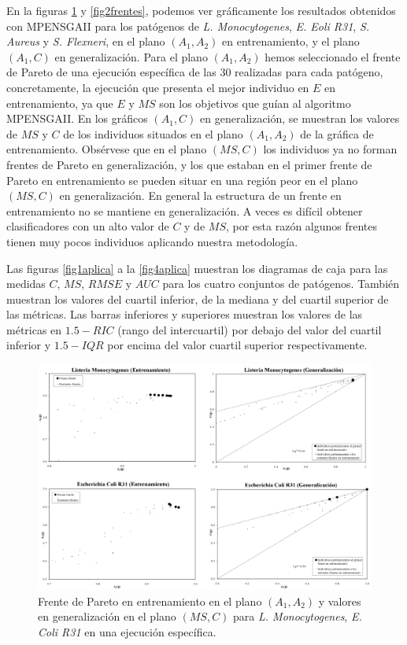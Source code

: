 En la figuras \ref{fig1frentes} y \ref{fig2frentes}, podemos ver gráficamente los resultados
obtenidos con
MPENSGAII para los patógenos de \textit{L. Monocytogenes}, \textit{E. Eoli R31}, \textit{S. Aureus}
y \textit{S. Flexneri}, en el plano $(A_{1},A_{2})$ en entrenamiento, y el plano $(A_{1},C)$ en
generalización. Para el plano $(A_{1},A_{2})$ hemos seleccionado el frente de Pareto de una
ejecución específica de las 30 realizadas para cada patógeno, concretamente, la ejecución
que presenta el mejor individuo en $E$ en entrenamiento, ya que $E$ y $MS$
son los objetivos que guían al algoritmo MPENSGAII. En los gráficos $(A_{1},C)$ en generalización,
se muestran los valores de $MS$ y $C$ de los individuos situados en el plano $(A_{1},A_{2})$
de la gráfica de entrenamiento. Obsérvese que en el plano $(MS,C)$ los
individuos ya no forman frentes de Pareto en generalización, y los que estaban en el
primer frente de Pareto en entrenamiento se pueden situar en una región peor en el plano $(MS,C)$ en
generalización. En general la estructura de un frente en entrenamiento no se mantiene en
generalización. A veces es difícil obtener clasificadores
con un alto valor de $C$ y de $MS$, por esta razón algunos frentes tienen muy
pocos individuos aplicando nuestra metodología.

Las figuras \ref{fig1aplica} a la \ref{fig4aplica} muestran los diagramas de caja \cite{Tukey1977}
para las medidas $C$, $MS$, $RMSE$ y $AUC$ para los cuatro conjuntos de patógenos. También muestran
los valores del cuartil inferior, de la mediana y del cuartil superior de las métricas. Las barras
inferiores y superiores muestran los valores de las métricas en $1.5-RIC$ (rango del intercuartil)
por debajo del valor del cuartil inferior y $1.5-IQR$ por encima del valor cuartil
superior respectivamente.
\begin{landscape}
\begin{figure}[!htb]
\centering
	\includegraphics[keepaspectratio,width=17cm]{figuras/frentes_ASC09_tanda1.jpg}
		\caption{Frente de Pareto en entrenamiento en el plano $(A_{1},A_{2})$ y
				valores en generalización en el plano $(MS,C)$ para \textit{L. Monocytogenes},
\textit{E. Coli R31} en una ejecución específica.}
	\label{fig1frentes}
\end{figure}
\end{landscape}

